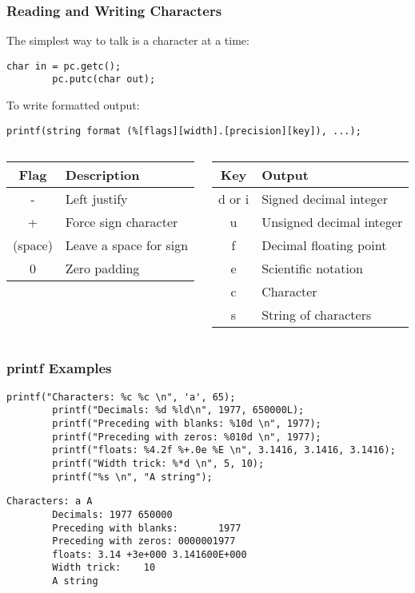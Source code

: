 \begin{frame}[fragile]
	\frametitle{Reading and Writing Characters}
	The simplest way to talk is a character at a time:
	\begin{lstlisting}[numbers=none,multicols=2]
		char in = pc.getc();
		pc.putc(char out);
	\end{lstlisting}
	To write formatted output:
	\begin{lstlisting}[numbers=none]
		printf(string format (%[flags][width].[precision][key]), ...);
	\end{lstlisting}
	\begin{columns}[T]
		\begin{column}{0.5\textwidth}
			\begin{tabular}{c|l}
				Flag & Description\\
				\hline
				- & Left justify\\
				+ & Force sign character\\
				(space) & Leave a space for sign\\
				0 & Zero padding\\
			\end{tabular}
		\end{column}
		\begin{column}{0.5\textwidth}
			\begin{tabular}{c|l}
				Key & Output\\
				\hline
				d or i & Signed decimal integer\\
				u & Unsigned decimal integer\\
				f & Decimal floating point\\
				e & Scientific notation\\
				c & Character\\
				s & String of characters\\
			\end{tabular}
		\end{column}
	\end{columns}
\end{frame}

\begin{frame}[fragile]
	\frametitle{printf Examples}
	\begin{lstlisting}[title={Code}]
		printf("Characters: %c %c \n", 'a', 65);
		printf("Decimals: %d %ld\n", 1977, 650000L);
		printf("Preceding with blanks: %10d \n", 1977);
		printf("Preceding with zeros: %010d \n", 1977);
		printf("floats: %4.2f %+.0e %E \n", 3.1416, 3.1416, 3.1416);
		printf("Width trick: %*d \n", 5, 10);
		printf("%s \n", "A string");
	\end{lstlisting}
	\begin{lstlisting}[title={Output}]
		Characters: a A
		Decimals: 1977 650000
		Preceding with blanks:       1977
		Preceding with zeros: 0000001977
		floats: 3.14 +3e+000 3.141600E+000
		Width trick:    10
		A string
	\end{lstlisting}
\end{frame}

